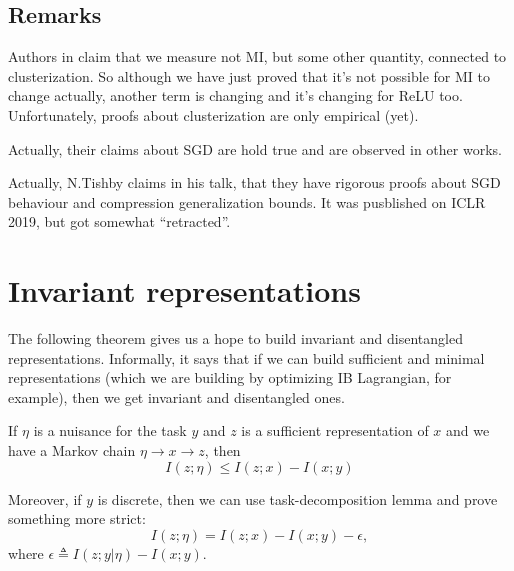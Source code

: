 \documentclass{article}
\begin{document}
\subsection{Remarks}
\begin{remark}
Authors in \cite{Estimating_MI_in_NNs} claim that we measure not MI, but some other quantity, connected to clusterization.
So although we have just proved that it's not possible for MI to change actually, another term is changing and it's changing for ReLU too.
Unfortunately, proofs about clusterization are only empirical (yet).
\end{remark}

\begin{remark}
Actually, their claims about SGD are hold true and are observed in other works.
\end{remark}

\begin{remark}
Actually, N.Tishby claims in his talk, that they have rigorous proofs about SGD behaviour and compression generalization bounds.
It was pusblished on ICLR 2019, but got somewhat ``retracted''.
\end{remark}


\section{Invariant representations}

The following theorem gives us a hope to build invariant and disentangled representations.
Informally, it says that if we can build sufficient and minimal representations (which we are building by optimizing IB Lagrangian, for example), then we get invariant and disentangled ones.

\begin{proposition}
If $\eta$ is a nuisance for the task $y$ and $z$ is a sufficient representation of $x$ and we have a Markov chain $\eta \to x \to z$, then
\[
I(z;\eta) \leq I(z;x) - I(x;y)
\]

Moreover, if $y$ is discrete, then we can use task-decomposition lemma and prove something more strict:
\[
I(z;\eta) = I(z;x) - I(x;y) - \epsilon,
\]
where $\epsilon \triangleq I(z; y|\eta) - I(x;y)$.
\end{proposition}
\end{document}

